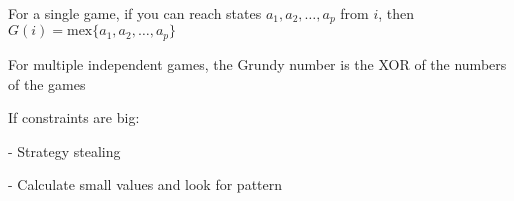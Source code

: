 For a single game, if you can reach states $a_1, a_2, \dots, a_p$ from $i$, then $G(i) = \text{mex} \{a_1, a_2, \dots, a_p \}$

For multiple independent games, the Grundy number is the XOR of the numbers of the games

If constraints are big:

- Strategy stealing

- Calculate small values and look for pattern